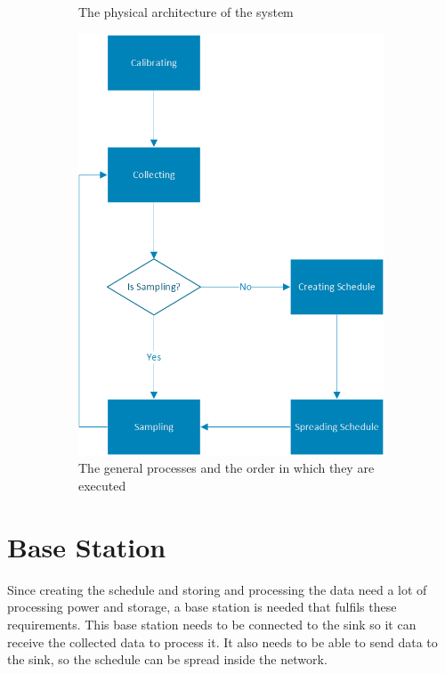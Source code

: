 \begin{figure}[htbp]
\begin{subfigure}[t]{0.4\textwidth}
   	 	\caption{The physical architecture of the system}
    	\label{fig:architecture}
    \end{subfigure}
    \quad
    \quad
    \quad
    \begin{subfigure}[t]{0.4\textwidth}
		\centering         
        \includegraphics[scale=0.7]{content/images/GeneralAproachM}
        \caption{The general processes and the order in which they are executed}
        \label{fig:processes}
    \end{subfigure}
    \caption{}
\end{figure}

\section{Base Station}
Since creating the schedule and storing and processing the data need a lot of processing power and storage, a base station is needed that fulfils these requirements. This base station needs to be connected to the sink so it can receive the collected data to process it. It also needs to be able to send data to the sink, so the schedule can be spread inside the network. 
  
